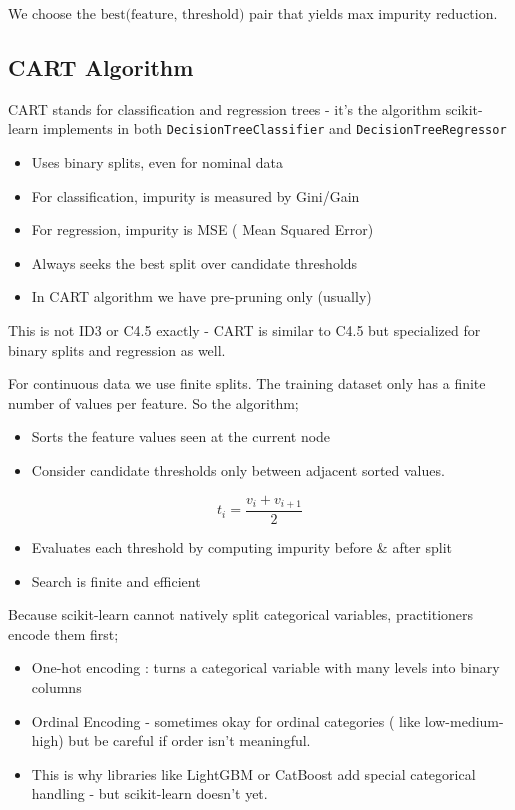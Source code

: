 \documentclass[10pt,a4paper]{article}
\begin{document}
		We choose the $\text{best(feature, threshold)}$ pair that yields max impurity reduction.
	
		\subsection{CART Algorithm}
	
		CART stands for classification and regression trees - it’s the algorithm scikit-learn implements in both \texttt{DecisionTreeClassifier} and \texttt{DecisionTreeRegressor}
	
		\begin{itemize}
			\item Uses binary splits, even for nominal data
			\item For classification, impurity is measured by Gini/Gain
			\item For regression, impurity is MSE ( Mean Squared Error)
			\item Always seeks the best split over candidate thresholds
			\item In CART algorithm we have pre-pruning only (usually)
		\end{itemize}
	
		This is not ID3 or C4.5 exactly - CART is similar to C4.5 but specialized for binary splits and regression as well.
	
		For continuous data we use finite splits. The training dataset only has a finite number of values per feature. So the algorithm;
	
		\begin{itemize}
			\item Sorts the feature values seen at the current node
			\item Consider candidate thresholds only between adjacent sorted values.
		\end{itemize}
	
		$$	t_i = \frac{v_i+v_{i+1}}{2}
		$$
		\begin{itemize}
			\item Evaluates each threshold by computing impurity before \& after split
			\item Search is finite and efficient
		\end{itemize}
	
	
		Because scikit-learn cannot natively split categorical variables, practitioners encode them first;
	
		\begin{itemize}
			\item One-hot encoding : turns a categorical variable with many levels into binary columns
			\item Ordinal Encoding - sometimes okay for ordinal categories ( like low-medium-high) but be careful if order isn’t meaningful.
			\item This is why libraries like LightGBM or CatBoost add special categorical handling - but scikit-learn doesn’t yet.
		\end{itemize}
	
\end{document}

